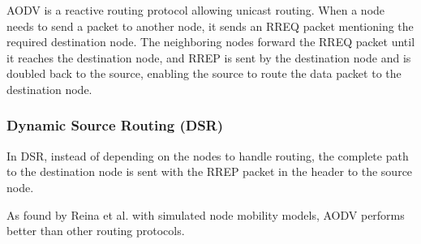 AODV is a reactive routing protocol allowing unicast routing. When a node needs
to send a packet to another node, it sends an RREQ packet mentioning the
required destination node\cite{reina2011}. The neighboring nodes forward the
RREQ packet until it reaches the destination node, and RREP is sent by the
destination node and is doubled back to the source, enabling the source to
route the data packet to the destination node\cite{reina2011}.

\subsubsection{Dynamic Source Routing (DSR)}

In DSR, instead of depending on the nodes to handle routing, the complete path
to the destination node is sent with the RREP packet in the header to the
source node\cite{chlamtac2003}.

As found by Reina et al. with simulated node mobility models, AODV performs
better than other routing protocols\cite{reina2011}.
